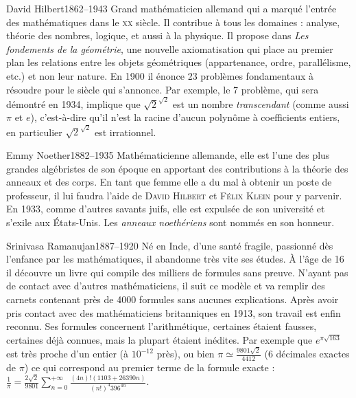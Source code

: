 \documentclass[10pt,class=article,crop=false]{standalone}
\begin{document}
\begin{multicols}{2}
\begin{biographie}{David Hilbert}{1862--1943}
Grand mathématicien allemand qui a marqué l'entrée des mathématiques dans le \textsc{xx}\ieme{} siècle.  Il contribue à tous les domaines : analyse, théorie des nombres, logique, et aussi à la physique.
Il propose dans \emph{Les fondements de la géométrie},  une nouvelle axiomatisation qui place au premier plan les relations entre les objets géométriques (appartenance, ordre, parallélisme, etc.) et non leur nature.
En 1900 il énonce 23 problèmes fondamentaux à résoudre pour le siècle qui s'annonce. Par exemple, le 7\ieme{} problème, qui sera démontré en 1934, implique que $\sqrt{2}^{\sqrt{2}}$ est un nombre \emph{transcendant} (comme aussi $\pi$ et $e$), c'est-à-dire qu'il n'est la racine d'aucun polynôme à coefficients entiers, en particulier $\sqrt{2}^{\sqrt{2}}$ est irrationnel.
\end{biographie}


\begin{biographie}{Emmy Noether}{1882--1935}
Mathématicienne allemande, elle est l'une des plus grandes algébristes de son époque en apportant des contributions à la théorie des anneaux et des corps.
En tant que femme elle a du mal à obtenir un poste de professeur, il lui faudra l'aide de \textsc{David Hilbert} et \textsc{Félix Klein} pour y parvenir. En 1933, comme d'autres savants juifs, elle est expulsée de son université et s'exile aux États-Unis. Les \emph{anneaux noethériens} sont nommés en son honneur.
\end{biographie}	


\begin{biographie}{Srinivasa Ramanujan}{1887--1920}
Né en Inde, d'une santé fragile, passionné dès l'enfance par les mathématiques, il abandonne très vite ses études. À l'âge de 16 il découvre un livre qui compile des milliers de formules sans preuve. N'ayant pas de contact avec d'autres mathématiciens, il suit ce modèle et va remplir des carnets contenant près de 4000 formules sans aucunes explications. Après avoir pris contact avec des mathématiciens britanniques en 1913, son travail est enfin reconnu. Ses formules concernent l'arithmétique, certaines étaient fausses, certaines déjà connues, mais la plupart étaient inédites. Par exemple que $e^{\pi\sqrt{163}}$ est très proche d'un entier (à $10^{-12}$ près), 
ou bien $\pi \simeq \frac{9801\sqrt{2}}{4412}$ ($6$ décimales exactes de $\pi$) ce qui correspond au premier terme de la formule exacte :
$\frac{1}{\pi}  = \frac{2\sqrt{2}}{9801} 
\sum_{n=0}^{+\infty} \frac{(4n)! (1103 + 26390n)}{(n!)^4 396^{4n}}$.
\end{biographie}



\end{multicols}
\end{document}
